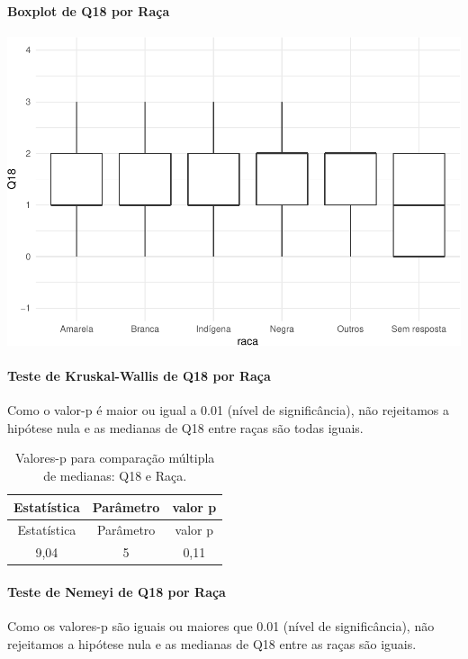 \documentclass[]{article}
\let\oldparagraph\paragraph
\renewcommand{\paragraph}[1]{\oldparagraph{#1}\mbox{}}
\begin{document}
\hypertarget{boxplot-de-q18-por-rauxe7a}{%
\paragraph{Boxplot de Q18 por Raça}\label{boxplot-de-q18-por-rauxe7a}}

\begin{center}\includegraphics[width=0.75\linewidth]{relatorio_covid19_files/figure-latex/unnamed-chunk-284-1} \end{center}

\hypertarget{teste-de-kruskal-wallis-de-q18-por-rauxe7a}{%
\paragraph{Teste de Kruskal-Wallis de Q18 por Raça}\label{teste-de-kruskal-wallis-de-q18-por-rauxe7a}}

Como o valor-p é maior ou igual a 0.01 (nível de significância), não rejeitamos a hipótese nula e as medianas de Q18 entre raças são todas iguais.

\begin{longtable}[]{@{}ccc@{}}
\caption{\label{tab:unnamed-chunk-286}Valores-p para comparação múltipla de medianas: Q18 e Raça.}\tabularnewline
\toprule
Estatística & Parâmetro & valor p\tabularnewline
\midrule
\endfirsthead
\toprule
Estatística & Parâmetro & valor p\tabularnewline
\midrule
\endhead
9,04 & 5 & 0,11\tabularnewline
\bottomrule
\end{longtable}

\hypertarget{teste-de-nemeyi-de-q18-por-rauxe7a}{%
\paragraph{Teste de Nemeyi de Q18 por Raça}\label{teste-de-nemeyi-de-q18-por-rauxe7a}}

Como os valores-p são iguais ou maiores que 0.01 (nível de significância), não rejeitamos a hipótese nula e as medianas de Q18 entre as raças são iguais.
\end{document}

